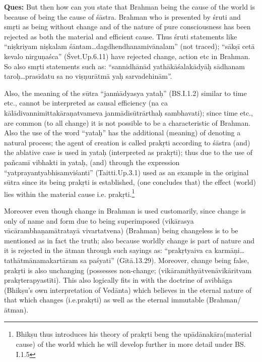 
\textbf{Ques:}  But then how can you state that Brahman being the cause of the world is because of being the cause of śāstra. Brahman who is presented by śruti and smṛti as being without change and of the nature of pure consciousness has been rejected as both the material and efficient cause. Thus śruti statements like “niṣkriyam niṣkalam śāntam…dagdhendhanamivānalam” (not traced); “sākṣī cetā kevalo nirguṇaśca” (Śvet.Up.6.11) have rejected change, action etc in Brahman. So also smṛti statements such as: “sannidhānād yathākāśalakādyāḥ sādhanam taroḥ…prasīdatu sa no viṣṇurātmā yaḥ sarvadehinām”.

Also, the meaning of the sūtra “janṁādyasya yataḥ” (BS.I.1.2) similar to time etc., cannot be interpreted as causal efficiency (na ca kālādivannimittakāraṇatvameva janmādisūtrārthaḥ sambhavati); since time etc., are common (to all change) it is not possible to be a characteristic of Brahman. Also the use of the word “yataḥ” has the additional (meaning) of denoting a natural process; the agent of creation is called prakṛti according to śāstra (and) the ablative case is used in yataḥ (interpreted as prakṛti); thus due to the use of pañcamī vibhakti in yataḥ, (and) through the expression “yatprayantyabhisamviśanti” (Taitti.Up.3.1) used as an example in the original sūtra since its being prakṛti is established, (one concludes that) the effect (world) lies within the material cause i.e. prakṛti.\footnote{Bhikṣu thus introduces his theory of prakṛti beng the upādānakāra(material cause) of the world which he will develop further in more detail under BS. I.1.5} 

Moreover even though change in Brahman is used customarily, since change is only of name and form due to being superimposed (vikārasya vācārambhaṇamātratayā vivartatvena) (Brahman) being changeless is to be mentioned as in fact the truth; also because worldly change is part of nature and it is rejected in the ātman through such sayings as: “prakṛtyaiva ca karmāṇi…tathātmānamakartāram sa paśyati” (Gītā.13.29). Moreover, change being false, prakṛti is also unchanging (possesses non-change; (vikāramithyātvenāvikāritvam prakṛterapyastīti). This also logically fits in with the doctrine of avibhāga (Bhikṣu’s own interpretation of Vedānta) which believes in the eternal nature of that which changes (i.e.prakṛti) as well as the eternal immutable (Brahman/ātman).

